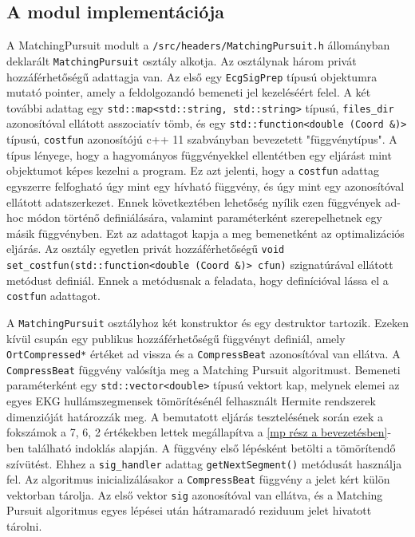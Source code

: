\documentclass[oneside,titlepage,12pt,a4paper]{report}
\begin{document}
\subsection*{A modul implementációja}

\par A MatchingPursuit modult a \texttt{/src/headers/MatchingPursuit.h} állományban deklarált \texttt{MatchingPursuit} osztály alkotja. Az osztálynak három privát hozzáférhetőségű adattagja van. Az első egy \texttt{EcgSigPrep} típusú objektumra mutató pointer, amely a feldolgozandó bemeneti jel kezeléséért felel. A két további adattag egy \texttt{std::map<std::string, std::string>} típusú, \texttt{files\_dir} azonosítóval ellátott asszociatív tömb, és egy \texttt{std::function<double (Coord \&)>} típusú, \texttt{costfun} azonosítójú c++ 11 szabványban bevezetett "függvénytípus". A típus lényege, hogy a hagyományos függvényekkel ellentétben egy eljárást mint objektumot képes kezelni a program. Ez azt jelenti, hogy a \texttt{costfun} adattag egyszerre felfogható úgy mint egy hívható függvény, és úgy mint egy azonosítóval ellátott adatszerkezet. Ennek következtében lehetőség nyílik ezen függvények ad-hoc módon történő definiálására, valamint paraméterként szerepelhetnek egy másik függvényben. Ezt az adattagot kapja a meg bemenetként az optimalizációs eljárás. Az osztály egyetlen privát hozzáférhetőségű \texttt{void set\_costfun(std::function<double (Coord \&)> cfun)} szignatúrával ellátott metódust definiál. Ennek a metódusnak a feladata, hogy definícióval lássa el a \texttt{costfun} adattagot. 
\par A \texttt{MatchingPursuit} osztályhoz két konstruktor és egy destruktor tartozik. Ezeken kívül csupán egy publikus hozzáférhetőségű függvényt definiál, amely \texttt{OrtCompressed*} értéket ad vissza és a \texttt{CompressBeat} azonosítóval van ellátva. 
A \texttt{CompressBeat} függvény valósítja meg a Matching Pursuit algoritmust. Bemeneti paraméterként egy \texttt{std::vector<double>}
típusú vektort kap, melynek elemei az egyes EKG hullámszegmensek tömörítésénél felhasznált Hermite rendszerek dimenzióját határozzák meg. 
A bemutatott eljárás tesztelésének során ezek a fokszámok a 7, 6, 2 értékekben lettek megállapítva a \ref{mp rész a bevezetésben}-ben 
található indoklás alapján. A függvény első lépésként betölti a tömörítendő szívütést. Ehhez a \texttt{sig\_handler} 
adattag \texttt{getNextSegment()} metódusát használja fel. Az algoritmus inicializálásakor a \texttt{CompressBeat} függvény a jelet kért külön vektorban tárolja.
Az első vektor \texttt{sig} azonosítóval van ellátva, és a Matching Pursuit algoritmus egyes lépései után hátramaradó reziduum jelet hivatott tárolni.
\end{document}
